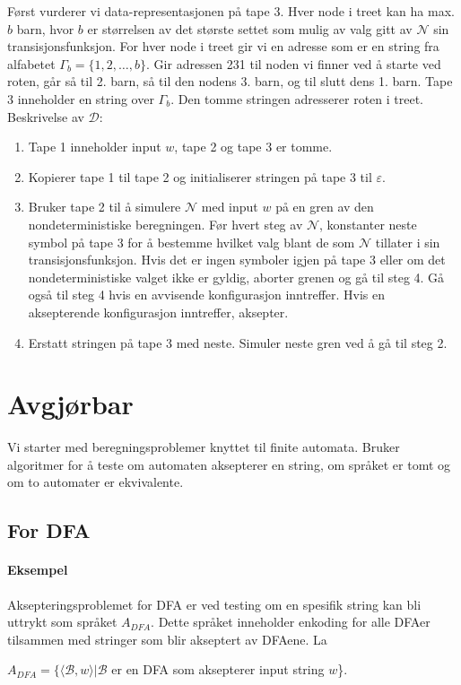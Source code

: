 \documentclass[11pt,a4paper]{article}
\begin{document}
Først vurderer vi data-representasjonen på tape 3. Hver node i treet kan ha max. $b$ barn, hvor $b$ er størrelsen av det største settet som mulig av valg gitt av $\mathcal{N}$ sin transisjonsfunksjon. For hver node i treet gir vi en adresse som er en string fra alfabetet $\Gamma_b = \{1,2,\dots,b\}$. Gir adressen 231 til noden vi finner ved å starte ved roten, går så til 2. barn, så til den nodens 3. barn, og til slutt dens 1. barn. Tape 3 inneholder en string over $\Gamma_b$. Den tomme stringen adresserer roten i treet.
\newline
\newline
Beskrivelse av $\mathcal{D}$:
\begin{enumerate}
\item{Tape 1 inneholder input $w$, tape 2 og tape 3 er tomme.}
\item{Kopierer tape 1 til tape 2 og initialiserer stringen på tape 3 til $\varepsilon$.}
\item{Bruker tape 2 til å simulere $\mathcal{N}$ med input $w$ på en gren av den nondeterministiske beregningen. Før hvert steg av $\mathcal{N}$, konstanter neste symbol på tape 3 for å bestemme hvilket valg blant de som $\mathcal{N}$ tillater i sin transisjonsfunksjon. Hvis det er ingen symboler igjen på tape 3 eller om det nondeterministiske valget ikke er gyldig, aborter grenen og gå til steg 4. Gå også til steg 4 hvis en avvisende konfigurasjon inntreffer. Hvis en aksepterende konfigurasjon inntreffer, aksepter.}
\item{Erstatt stringen på tape 3 med neste. Simuler neste gren ved å gå til steg 2.}
\end{enumerate}

\section{Avgjørbar}
Vi starter med beregningsproblemer knyttet til finite automata. Bruker algoritmer for å teste om automaten aksepterer en string, om språket er tomt og om to automater er ekvivalente.

\subsection{For DFA}
\paragraph{Eksempel} Aksepteringsproblemet for DFA er ved testing om en spesifik string kan bli uttrykt som språket $A_{DFA}$.
Dette språket inneholder enkoding for alle DFAer tilsammen med stringer som blir akseptert av DFAene. La
\begin{center}
$A_{DFA} = \{\langle \mathcal{B},w \rangle | \mathcal{B} $ er en DFA som aksepterer input string $w$\}.
\end{center}
\end{document}
